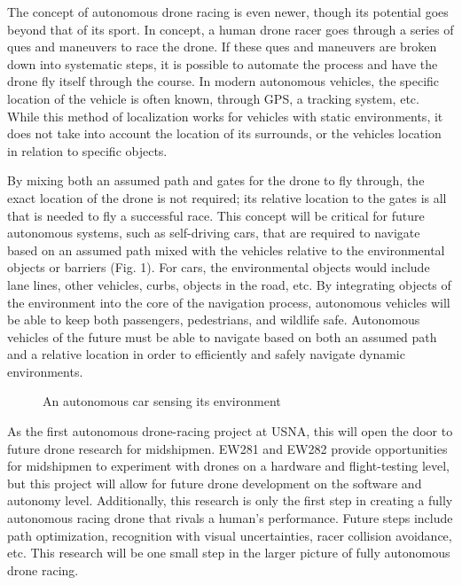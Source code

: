 \documentclass[onecolumn,10pt]{IEEEtran}
\begin{document}
The concept of autonomous drone racing is even newer, though its potential goes beyond that of its sport. In concept, a human drone racer goes through a series of ques and maneuvers to race the drone. If these ques and maneuvers are broken down into systematic steps, it is possible to automate the process and have the drone fly itself through the course. In modern autonomous vehicles, the specific location of the vehicle is often known, through GPS, a tracking system, etc. While this method of localization works for vehicles with static environments, it does not take into account the location of its surrounds, or the vehicles location in relation to specific objects. 

By mixing both an assumed path and gates for the drone to fly through, the exact location of the drone is not required; its relative location to the gates is all that is needed to fly a successful race. This concept will be critical for future autonomous systems, such as self-driving cars, that are required to navigate based on an assumed path mixed with the vehicles relative to the environmental objects or barriers (Fig. 1). For cars, the environmental objects would include lane lines, other vehicles, curbs, objects in the road, etc. By integrating objects of the environment into the core of the navigation process, autonomous vehicles will be able to keep both passengers, pedestrians, and wildlife safe. Autonomous vehicles of the future must be able to navigate based on both an assumed path and a relative location in order to efficiently and safely navigate dynamic environments.  
\begin{figure}
\caption{An autonomous car sensing its environment}
\label{fig2}
\end{figure}

As the first autonomous drone-racing project at USNA, this will open the door to future drone research for midshipmen. EW281 and EW282 provide opportunities for midshipmen to experiment with drones on a hardware and flight-testing level, but this project will allow for future drone development on the software and autonomy level. Additionally, this research is only the first step in creating a fully autonomous racing drone that rivals a human’s performance. Future steps include path optimization, recognition with visual uncertainties, racer collision avoidance, etc. This research will be one small step in the larger picture of fully autonomous drone racing.
\end{document}
